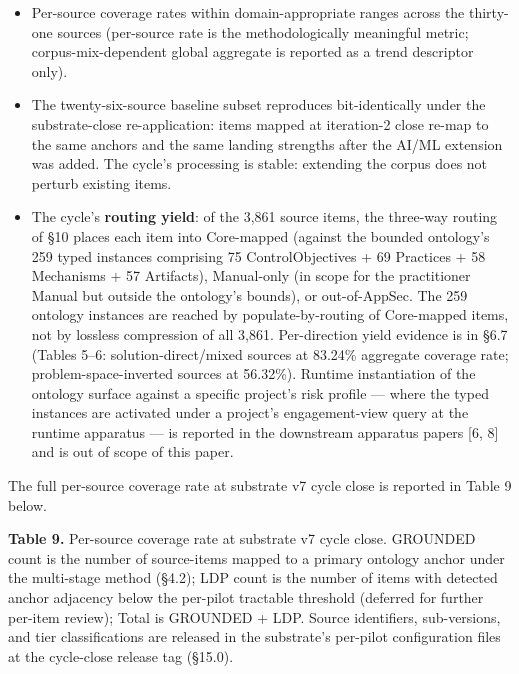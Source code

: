 \documentclass[
]{article}
\providecommand{\tightlist}{%
  \setlength{\itemsep}{0pt}\setlength{\parskip}{0pt}}
\begin{document}
\begin{itemize}
\tightlist
\item
  Per-source coverage rates within domain-appropriate ranges across the
  thirty-one sources (per-source rate is the methodologically meaningful
  metric; corpus-mix-dependent global aggregate is reported as a trend
  descriptor only).
\item
  The twenty-six-source baseline subset reproduces bit-identically under
  the substrate-close re-application: items mapped at iteration-2 close
  re-map to the same anchors and the same landing strengths after the
  AI/ML extension was added. The cycle's processing is stable: extending
  the corpus does not perturb existing items.
\item
  The cycle's \textbf{routing yield}: of the 3,861 source items, the
  three-way routing of §10 places each item into Core-mapped (against
  the bounded ontology's 259 typed instances comprising 75
  ControlObjectives + 69 Practices + 58 Mechanisms + 57 Artifacts),
  Manual-only (in scope for the practitioner Manual but outside the
  ontology's bounds), or out-of-AppSec. The 259 ontology instances are
  reached by populate-by-routing of Core-mapped items, not by lossless
  compression of all 3,861. Per-direction yield evidence is in §6.7
  (Tables 5--6: solution-direct/mixed sources at 83.24\% aggregate
  coverage rate; problem-space-inverted sources at 56.32\%). Runtime
  instantiation of the ontology surface against a specific project's
  risk profile --- where the typed instances are activated under a
  project's engagement-view query at the runtime apparatus --- is
  reported in the downstream apparatus papers {[}6, 8{]} and is out of
  scope of this paper.
\end{itemize}

The full per-source coverage rate at substrate v7 cycle close is
reported in Table 9 below.

\textbf{Table 9.} Per-source coverage rate at substrate v7 cycle close.
GROUNDED count is the number of source-items mapped to a primary
ontology anchor under the multi-stage method (§4.2); LDP count is the
number of items with detected anchor adjacency below the per-pilot
tractable threshold (deferred for further per-item review); Total is
GROUNDED + LDP. Source identifiers, sub-versions, and tier
classifications are released in the substrate's per-pilot configuration
files at the cycle-close release tag (§15.0).
\end{document}
